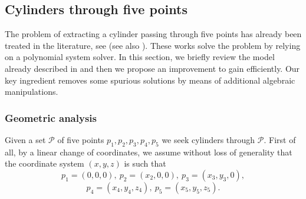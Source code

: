 \documentclass[5p]{elsarticle}
\newcommand\Pc{\mathcal P}
\newcommand{\lb}[1]{{\color{black} #1}}
\begin{document}
\subsection{Cylinders through five points}

The problem of extracting a cylinder passing through five points has already been treated in the literature, see \cite{Devillers02,BKM05,Lichtblau12} \lb{(see also \cite{Chaperon:2001:ECF:647260.718511,Beder:2006:DSC:2094437.2094451})}. These works solve the problem by relying on a polynomial system solver. In this section, we briefly review the model already described in \cite{Devillers02} and then we propose an improvement to gain efficiently. Our key ingredient removes some spurious solutions by means of additional algebraic manipulations. 

\subsubsection{Geometric analysis}

\lb{Given} a set $\Pc$ of five points $p_1, p_2, p_3, p_4, p_5$ \lb{we seek cylinders} through $\Pc$. First of all, \lb{by a linear} change of coordinates, we assume without loss of generality that the coordinate system $(x,y,z)$ is such that
\begin{equation}\label{eq:hyp-p1p2p3p4p5}
p_1=(0,0,0), \ p_2=(x_2,0,0), \ p_3=(x_3,y_3,0),	
\end{equation} 
$$p_4=(x_4,y_4,z_4), \ p_5=(x_5,y_5,z_5). $$
\end{document}
